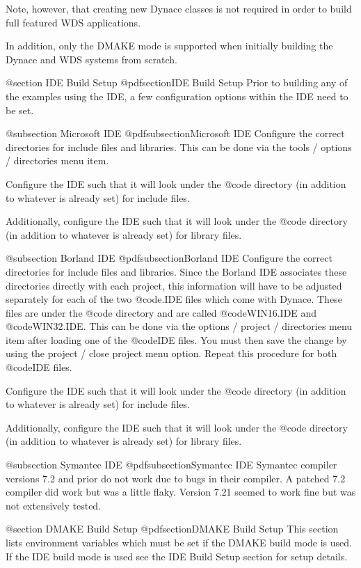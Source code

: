 Note, however, that creating new Dynace classes is not required in
order to build full featured WDS applications.

In addition, only the DMAKE mode is supported when initially building
the Dynace and WDS systems from scratch.


@section IDE Build Setup
@pdfsection{IDE Build Setup}
Prior to building any of the examples using the IDE, a few configuration
options within the IDE need to be set.

@subsection Microsoft IDE
@pdfsubsection{Microsoft IDE}
Configure the correct directories for include files and libraries.
This can be done via the tools / options / directories menu item.

Configure the IDE such that it will look under the
@code{\DYNACE\INCLUDE} directory (in addition to whatever is already
set) for include files.

Additionally, configure the IDE such that it
will look under the @code{\DYNACE\LIB} directory (in addition to
whatever is already set) for library files.


@subsection Borland IDE
@pdfsubsection{Borland IDE}
Configure the correct directories for include files and libraries.
Since the Borland IDE associates these directories directly with
each project, this information will have to be adjusted separately
for each of the two @code{.IDE} files which come with Dynace.
These files are under the @code{\DYNACE\WINEXAM\SETUP} directory
and are called @code{WIN16.IDE} and @code{WIN32.IDE}.
This can be done via the options / project / directories menu item
after loading one of the @code{IDE} files.  You must then save the
change by using the project / close project menu option.  Repeat this
procedure for both @code{IDE} files.

Configure the IDE such that it will look under the
@code{\DYNACE\INCLUDE} directory (in addition to whatever is already
set) for include files.

Additionally, configure the IDE such that it will look under the
@code{\DYNACE\LIB} directory (in addition to whatever is already set)
for library files.

@subsection Symantec IDE
@pdfsubsection{Symantec IDE}
Symantec compiler versions 7.2 and prior do not work due to bugs in
their compiler.  A patched 7.2 compiler did work but was a little
flaky.  Version 7.21 seemed to work fine but was not extensively
tested.

@section DMAKE Build Setup
@pdfsection{DMAKE Build Setup}
This section lists environment variables which must be set if the
DMAKE build mode is used.  If the IDE build mode is used
see the IDE Build Setup section for setup details.

